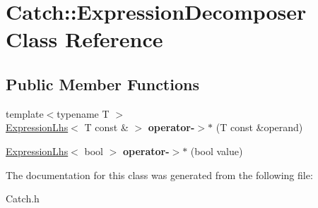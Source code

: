 \hypertarget{class_catch_1_1_expression_decomposer}{\section{Catch\-:\-:Expression\-Decomposer Class Reference}
\label{class_catch_1_1_expression_decomposer}
}
\subsection*{Public Member Functions}
\begin{DoxyCompactItemize}
\item 
\hypertarget{class_catch_1_1_expression_decomposer_a22496794d8f55e571ff719516eba4d49}{{\footnotesize template$<$typename T $>$ }\\\hyperlink{class_catch_1_1_expression_lhs}{Expression\-Lhs}$<$ T const \& $>$ {\bfseries operator-\/$>$$\ast$} (T const \&operand)}\label{class_catch_1_1_expression_decomposer_a22496794d8f55e571ff719516eba4d49}

\item 
\hypertarget{class_catch_1_1_expression_decomposer_afd4a9fca08154c361ea2a144a244be18}{\hyperlink{class_catch_1_1_expression_lhs}{Expression\-Lhs}$<$ bool $>$ {\bfseries operator-\/$>$$\ast$} (bool value)}\label{class_catch_1_1_expression_decomposer_afd4a9fca08154c361ea2a144a244be18}

\end{DoxyCompactItemize}


The documentation for this class was generated from the following file\-:\begin{DoxyCompactItemize}
\item 
Catch.\-h\end{DoxyCompactItemize}
